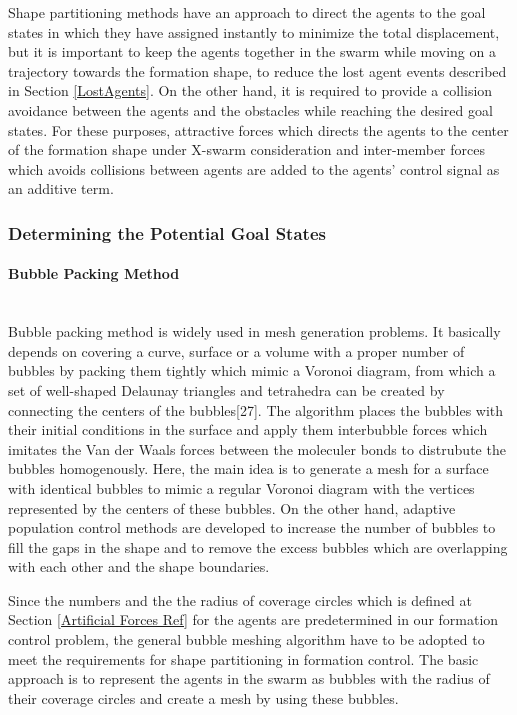 Shape partitioning methods have an approach to direct the agents to the goal states in which they have assigned instantly to minimize the total displacement, but it is important to keep the agents together in the swarm while moving on a trajectory towards the formation shape, to reduce the lost agent events described in Section \ref{LostAgents}. On the other hand, it is required to provide a collision avoidance between the agents and the obstacles while reaching the desired goal states. For these purposes, attractive forces which directs the agents to the center of the formation shape under X-swarm consideration and inter-member forces which avoids collisions between agents are added to the agents' control signal as an additive term. 
			
\subsubsection{Determining the Potential Goal States} \label{Partitioning_ref}
\paragraph{Bubble Packing Method} \hspace{0pt} \\				
Bubble packing method is widely used in mesh generation problems. It basically depends on covering a curve, surface or a volume with a proper number of bubbles by packing them tightly which mimic a Voronoi diagram, from which a set of well-shaped Delaunay triangles and tetrahedra can be created by connecting the centers of the bubbles[27].  The algorithm places the bubbles with their initial conditions in the surface and apply them interbubble forces which imitates the Van der Waals forces between the moleculer bonds  to distrubute the bubbles homogenously. Here, the main idea is to generate a mesh for a surface with identical bubbles to mimic a regular Voronoi diagram with the vertices represented by the centers of these bubbles. On the other hand, adaptive population control  methods are developed to increase the number of bubbles to fill the gaps in the shape and to remove the excess bubbles which are overlapping with each other and the shape boundaries. 

Since the numbers and the the radius of coverage circles which is defined at Section \ref{Artificial Forces Ref} for the agents are predetermined in our formation control problem, the general bubble meshing algorithm have to be adopted to meet the requirements for shape partitioning in formation control.  The basic approach is to represent the agents in the swarm as bubbles with the radius of  their coverage circles and create a mesh by using these bubbles. \newline
			

